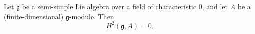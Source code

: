 Let $\mathfrak{g}$ be a semi-simple Lie algebra over a field of characteristic $0$, and let $A$ be a (finite-dimensional) $\mathfrak{g}$-module. Then
$$H^2(\mathfrak{g}, A) = 0.$$